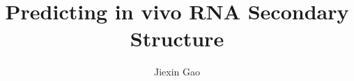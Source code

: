 \documentclass{ut-thesis}
\author{Jiexin Gao}
\title{Predicting in vivo RNA Secondary Structure}
\begin{document}
\begin{preliminary}

\maketitle

\begin{abstract}

    \cite{rouskin2014genome}

\end{abstract}

\tableofcontents

\end{preliminary}






\end{document}
